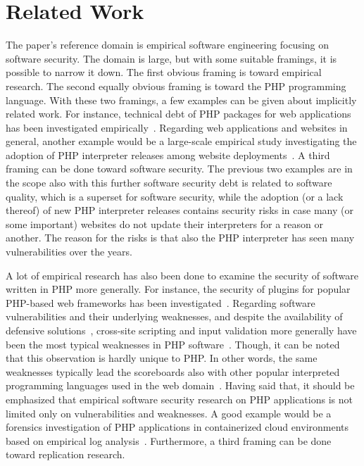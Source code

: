 \section{Related Work}
\label{sec: related work}

The paper's reference domain is empirical software engineering focusing on
software security. The domain is large, but with some suitable framings, it is
possible to narrow it down. The first obvious framing is toward empirical
research. The second equally obvious framing is toward the PHP programming
language. With these two framings, a few examples can be given about implicitly
related work. For instance, technical debt of PHP packages for web applications
has been investigated empirically~\cite{Amanatidis17}. Regarding web
applications and websites in general, another example would be a large-scale
empirical study investigating the adoption of PHP interpreter releases among
website deployments~\cite{Ruohonen17APSEC}. A third framing can be done toward
software security. The previous two examples are in the scope also with this
further software security  debt is related to software
quality, which is a superset for software security, while the adoption (or a
lack thereof) of new PHP interpreter releases contains security risks in case
many (or some important) websites do not update their interpreters for a reason
or another. The reason for the risks is that also the PHP interpreter has seen
many vulnerabilities over the years.

A lot of empirical research has also been done to examine the security of
software written in PHP more generally. For instance, the security of plugins
for popular PHP-based web frameworks has been investigated~\cite{Niemietz21,
  Ruohonen19EASE}. Regarding software vulnerabilities and their underlying
weaknesses, and despite the availability of defensive solutions~\cite{Dahse15},
cross-site scripting and input validation more generally have been the most
typical weaknesses in PHP software~\cite{Ruohonen19EASE, Santos17}. Though, it
can be noted that this observation is hardly unique to PHP. In other words, the
same weaknesses typically lead the scoreboards also with other popular
interpreted programming languages used in the web
domain~\cite{Ruohonen18IWESEP}. Having said that, it should be emphasized that
empirical software security research on PHP applications is not limited only on
vulnerabilities and weaknesses. A good example would be a forensics
investigation of PHP applications in containerized cloud environments based on
empirical log analysis~\cite{Hyder24}. Furthermore, a third framing can be done
toward replication research.


